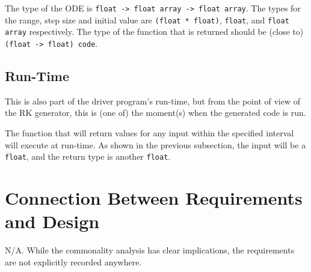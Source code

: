 \documentclass[12pt, titlepage]{article}
\begin{document}
The type of the ODE is \lstinline|float -> float array -> float array|. The 
types for the range, step size and initial value are 
\lstinline|(float * float)|, \lstinline|float|, and \lstinline|float array| 
respectively.
The type of the function that is returned should be (close to) 
\lstinline|(float -> float) code|.

\subsection{Run-Time}
This is also part of the driver program's run-time, but from the point of view 
of the RK generator, this is (one of) the moment(s) when the generated code is 
run.

The function that will return values for any input within the specified 
interval will execute at run-time.
As shown in the previous subsection, the input will be a \lstinline|float|, and 
the return type is another \lstinline|float|.

\section{Connection Between Requirements and Design} \label{SecConnection}

N/A. While the commonality analysis has clear implications, the requirements 
are not explicitly recorded anywhere. 
\end{document}

